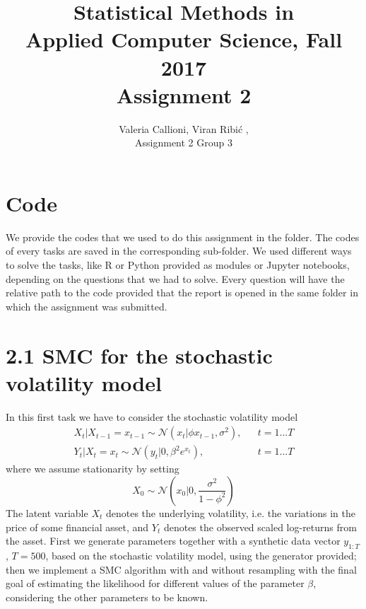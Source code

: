 \documentclass[]{article}
\title{Statistical Methods in \\ Applied Computer Science, Fall 2017 \\ Assignment 2}
\author{Valeria Callioni, Viran Ribi\'c , \\ Assignment 2 Group 3}
\begin{document}
	\maketitle
	
	\newpage
	
	\section*{Code}
	
	We provide the codes that we used to do this assignment in the folder. The codes of every tasks are saved in the corresponding sub-folder. We used different ways to solve the tasks, like R or Python provided as modules or Jupyter  notebooks, depending on the questions that we had to solve. Every question will have the relative path to the code provided that the report is opened in the same folder in which the assignment was submitted.
	
	\newpage
	
	\section*{2.1 SMC for the stochastic volatility model}
	In this first task we have to consider the stochastic volatility model
	\begin{align*}
	X_t|X_{t-1} = x_{t-1} \sim \mathcal{N}(x_t | \phi x_{t-1},\sigma^2), && t=1...T 
	\\
	Y_t|X_t = x_t \sim \mathcal{N}(y_t | 0, \beta^2e^{x_t}), && t=1...T 
	\end{align*}
	where we assume stationarity by setting 
	$$
	X_0 \sim \mathcal{N}(x_0 | 0, \frac{\sigma^2}{1-\phi^2})
	$$
	The latent variable $X_t$ denotes the underlying volatility, i.e. the variations in the price of some ﬁnancial asset, and $Y_t$ denotes the observed scaled log-returns from the asset. 
	First we generate parameters together with a synthetic data vector $y_{1:T}$, $T = 500$, based on the stochastic volatility model, using the generator provided; then we implement a SMC algorithm with and without resampling with the final goal of estimating the likelihood for different values of the parameter $\beta$, considering the other parameters to be known. 
	
\end{document}
